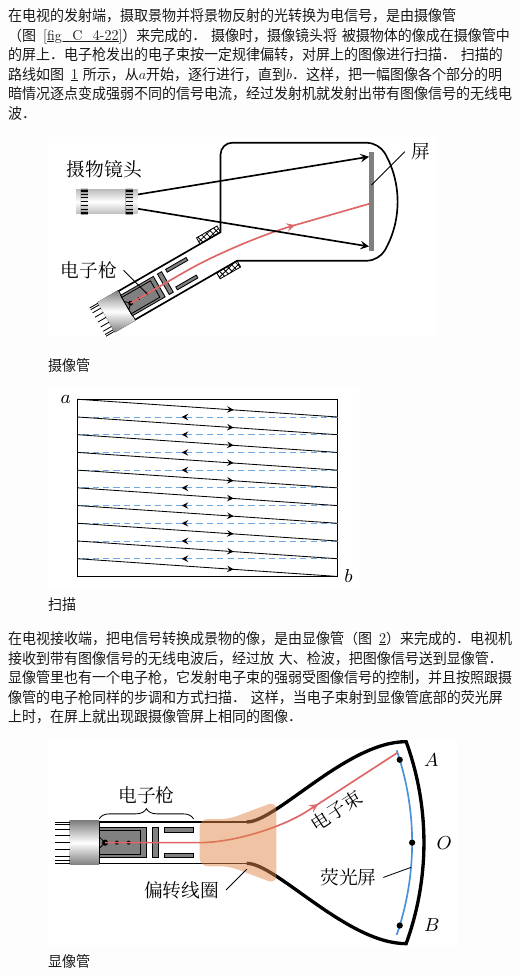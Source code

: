 在电视的发射端，摄取景物并将景物反射的光转换为电信号，是由摄像管（图~\ref{fig_C_4-22}）来完成的．
摄像时，摄像镜头将
被摄物体的像成在摄像管中的屏上．电子枪发出的电子束按一定规律偏转，对屏上的图像进行扫描．
扫描的路线如图~\ref{fig_C_4-23} 所示，从$a$开始，逐行进行，直到$b$．这样，把一幅图像各个部分的明暗情况逐点变成强弱不同的信号电流，经过发射机就发射出带有图像信号的无线电波．
\begin{figure}[htbp]
	\centering
	\begin{minipage}[b]{0.48\linewidth}
		\centering
		\includegraphics{fig/C/4-22.pdf}
		\caption{摄像管}\label{fig_C_4-22}
	\end{minipage}
	\begin{minipage}[b]{0.48\linewidth}
		\centering
		\includegraphics{fig/C/4-23.pdf}
		\caption{扫描}\label{fig_C_4-23}
	\end{minipage}
\end{figure}


    
在电视接收端，把电信号转换成景物的像，是由显像管（图~\ref{fig_C_4-24}）来完成的．电视机接收到带有图像信号的无线电波后，经过放
大、检波，把图像信号送到显像管．
显像管里也有一个电子枪，它发射电子束的强弱受图像信号的控制，并且按照跟摄像管的电子枪同样的步调和方式扫描．
这样，当电子束射到显像管底部的荧光屏上时，在屏上就出现跟摄像管屏上相同的图像．
\begin{figure}[htbp]
	\centering
	\centering
	\includegraphics{fig/C/4-24.pdf}
	\caption{显像管}\label{fig_C_4-24}
\end{figure}



